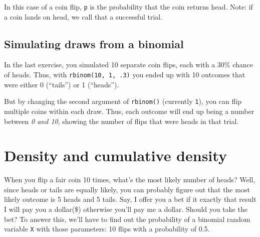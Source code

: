 \documentclass[]{article}
\newenvironment{Shaded}{\begin{snugshade}}{\end{snugshade}}
\newcommand{\CommentTok}[1]{\textcolor[rgb]{0.56,0.35,0.01}{\textit{#1}}}
\newcommand{\DataTypeTok}[1]{\textcolor[rgb]{0.13,0.29,0.53}{#1}}
\newcommand{\DecValTok}[1]{\textcolor[rgb]{0.00,0.00,0.81}{#1}}
\newcommand{\FloatTok}[1]{\textcolor[rgb]{0.00,0.00,0.81}{#1}}
\newcommand{\KeywordTok}[1]{\textcolor[rgb]{0.13,0.29,0.53}{\textbf{#1}}}
\newcommand{\NormalTok}[1]{#1}
\begin{document}
In this case of a coin flip, \texttt{p} is the probability that the coin
returns head. Note: if a coin lands on head, we call that a successful
trial.

\hypertarget{simulating-draws-from-a-binomial}{%
\subsection{Simulating draws from a
binomial}\label{simulating-draws-from-a-binomial}}

In the last exercise, you simulated 10 separate coin flips, each with a
30\% chance of heads. Thus, with \texttt{rbinom(10,\ 1,\ .3)} you ended
up with 10 outcomes that were either 0 (``tails'') or 1 (``heads'').

But by changing the second argument of \texttt{rbinom()} (currently
\texttt{1}), you can flip multiple coins within each draw. Thus, each
outcome will end up being a number between \emph{0 and 10}, showing the
number of flips that were heads in that trial.

\begin{Shaded}
\end{Shaded}

\hypertarget{density-and-cumulative-density}{%
\section{Density and cumulative
density}\label{density-and-cumulative-density}}

When you flip a fair coin 10 times, what's the most likely number of
heads? Well, since heads or tails are equally likely, you can probably
figure out that the most likely outcome is 5 heads and 5 tails. Say, I
offer you a bet if it exactly that result I will pay you a dollar(\$)
otherwise you'll pay me a dollar. Should you take the bet? To answer
this, we'll have to find out the probability of a binomial random
variable \texttt{X} with those parameters: 10 flips with a probability
of 0.5.
\end{document}
